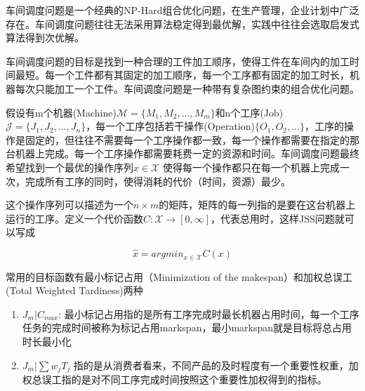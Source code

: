 车间调度问题是一个经典的NP-Hard组合优化问题，在生产管理，企业计划中广泛存在。车间调度问题往往无法采用算法稳定得到最优解，实践中往往会选取启发式算法得到次优解。

车间调度问题的目标是找到一种合理的工件加工顺序，使得工件在车间内的加工时间最短。每一个工件都有其固定的加工顺序，每一个工序都有固定的加工时长，机器每次只能加工一个工件。车间调度问题是一种带有复杂图约束的组合优化问题。

假设有m个机器(Machine)$\mathcal{M}=\{M_1,M_2,\dots,M_m\}$和n个工序(Job)$\mathcal{J}=\{J_1,J_2,\dots,J_n\}$，每一个工序包括若干操作(Operation)$\{O_1,O_2,\dots\}$，工序的操作是固定的，但往往不需要每一个工序操作都一致，每一个操作都需要在指定的那台机器上完成。每一个工序操作都需要耗费一定的资源和时间。车间调度问题最终希望找到一个最优的操作序列$x\in \mathcal{X}$ 使得每一个操作都只在每一个机器上完成一次，完成所有工序的同时，使得消耗的代价（时间，资源）最少。

这个操作序列可以描述为一个$n\times m$的矩阵，矩阵的每一列指的是要在这台机器上运行的工序。定义一个代价函数$C:\mathcal{X}\rightarrow [0,\infty]$，代表总用时，这样JSS问题就可以写成

$$\hat{x}=argmin_{x\in \mathcal{X}}C(x)$$

常用的目标函数有最小标记占用（Minimization of the makespan）和加权总误工(Total Weighted Tardiness)两种

\begin{enumerate}
    \item $J_m|C_{max}$: 最小标记占用指的是所有工序完成时最长机器占用时间，每一个工序任务的完成时间被称为标记占用markspan，最小markspan就是目标将总占用时长最小化
    \item $J_m|\sum w_jT_j$ 指的是从消费者看来，不同产品的及时程度有一个重要性权重，加权总误工指的是对不同工序完成时间按照这个重要性加权得到的指标。
\end{enumerate}
